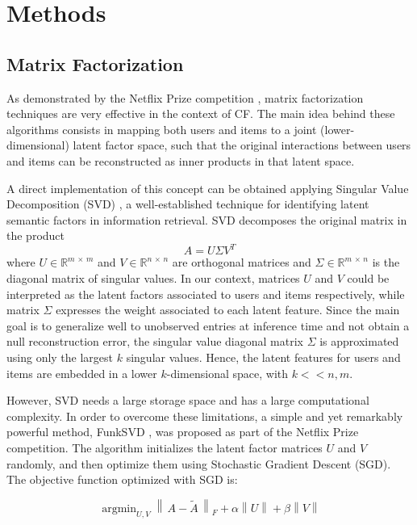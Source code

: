 \documentclass[sigconf]{acmart}
\DeclareMathOperator*{\argmin}{argmin}
\begin{document}
\section{Methods}
\label{sect:methods}
\subsection{Matrix Factorization}
As demonstrated by the Netflix Prize competition \cite{bennett2007netflix}, matrix factorization techniques are very effective in the context of CF.
The main idea behind these algorithms consists in mapping both users and items to a joint (lower-dimensional) latent factor space, such that the original interactions between users and items can be reconstructed as inner products in that latent space. 

A direct implementation of this concept can be obtained applying Singular Value Decomposition (SVD) \cite{clsvd}, a well-established technique for identifying latent semantic factors in information retrieval.
SVD decomposes the original matrix in the product
\begin{equation}
    A = U \Sigma V^T
\end{equation}
where $U\in \mathbb{R}^{m\,\times \,m}$ and $V\in \mathbb{R}^{n\,\times \, n}$ are orthogonal matrices and $\Sigma \in \mathbb{R}^{m\,\times \, n}$ is the diagonal matrix of singular values. 
In our context, matrices $U$ and $V$ could be interpreted as the latent factors associated to users and items respectively, while matrix $\Sigma$ expresses the weight associated to each latent feature. 
Since the main goal is to generalize well to unobserved entries at inference time and not obtain a null reconstruction error, the singular value diagonal matrix $\Sigma$ is approximated using only the largest $k$ singular values. Hence, the latent features for users and items are embedded in a lower $k$-dimensional space, with $k<\!\!<n,m$.

However, SVD needs a large storage space and has a large computational complexity. In order to overcome these limitations, a simple and yet remarkably powerful method, FunkSVD \cite{funk}, was proposed as part of the Netflix Prize competition. 
The algorithm initializes the latent factor matrices $U$ and $V$ randomly, and then optimize them using Stochastic Gradient Descent (SGD). The objective function optimized with SGD is:

\begin{equation}
    \argmin_{U,V} \left\lVert \, A - \widetilde{A} \,\right\rVert_F + \alpha  \left\lVert U \right\rVert + \beta \left\lVert V \right\rVert
\end{equation}
\end{document}
